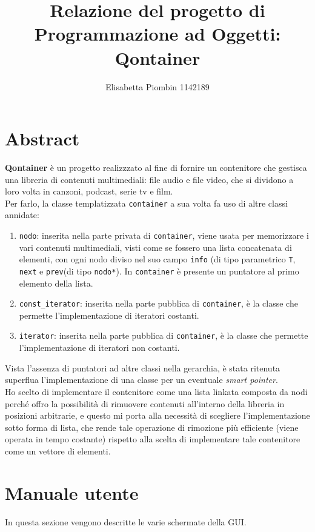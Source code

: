 \documentclass[a4paper,10pt]{article}
\begin{document}
\title {Relazione del progetto di Programmazione ad Oggetti: Qontainer}
\author {Elisabetta Piombin 1142189}
\date{}

\maketitle
\tableofcontents
\clearpage\mbox{}

\section{Abstract}
\textbf{Qontainer} è un progetto realizzzato al fine di fornire un contenitore che gestisca una libreria di contenuti multimediali: file audio e file video, che si dividono a loro volta in canzoni, podcast, serie tv e film. \\
Per farlo, la classe templatizzata \texttt{container} a sua volta fa uso di altre classi annidate:
\begin{enumerate}
\item \texttt{nodo}: inserita nella parte privata di \texttt{container}, viene usata per memorizzare i vari contenuti multimediali, visti come se fossero una lista concatenata di elementi, con ogni nodo diviso nel suo campo \texttt{info} (di tipo parametrico \texttt{T}, \texttt{next} e \texttt{prev}(di tipo \texttt{nodo*}). In \texttt{container} è presente un puntatore al primo elemento della lista.
\item \texttt{const\_iterator}: inserita nella parte pubblica di \texttt{container}, è la classe che permette l'implementazione di iteratori costanti.
\item \texttt{iterator}: inserita nella parte pubblica di \texttt{container}, è la classe che permette l'implementazione di iteratori non costanti.
\end{enumerate}
Vista l'assenza di puntatori ad altre classi nella gerarchia, è stata ritenuta superflua l'implementazione di una classe per un eventuale \textit{smart pointer}.\\
Ho scelto di implementare il contenitore come una lista linkata composta da nodi perché offro la possibilità di rimuovere contenuti all'interno della libreria in posizioni arbitrarie, e questo mi porta alla necessità di scegliere l'implementazione sotto forma di lista, che rende tale operazione di rimozione più efficiente (viene operata in tempo costante) rispetto alla scelta di implementare tale contenitore come un vettore di elementi.
\section{Manuale utente}
In questa sezione vengono descritte le varie schermate della GUI.\\
\end{document}

